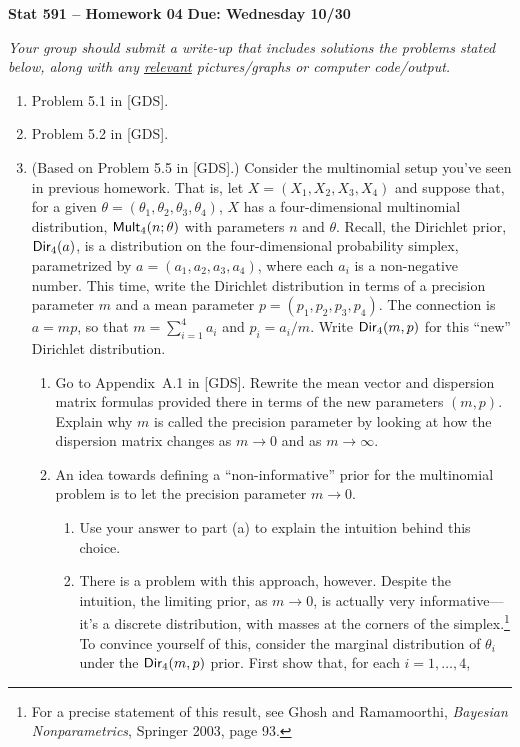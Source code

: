 \documentclass[a4paper,12pt]{article}
\begin{document}
\noindent \large \textbf{Stat 591 -- Homework 04} \hfill \textbf{Due: Wednesday 10/30} \normalsize

\medskip

\noindent \emph{Your group should submit a write-up that includes solutions the problems stated below, along with any \underline{relevant} pictures/graphs or computer code/output.}  

\medskip

\begin{enumerate}

\item Problem 5.1 in [GDS].

\item Problem 5.2 in [GDS].

\item (Based on Problem 5.5 in [GDS].)  Consider the multinomial setup you've seen in previous homework.  That is, let $X=(X_1,X_2,X_3,X_4)$ and suppose that, for a given $\theta=(\theta_1,\theta_2,\theta_3,\theta_4)$, $X$ has a four-dimensional multinomial distribution, ${\sf Mult}_4(n;\theta)$ with parameters $n$ and $\theta$.  Recall, the Dirichlet prior, ${\sf Dir}_4(a)$, is a distribution on the four-dimensional probability simplex, parametrized by $a=(a_1,a_2,a_3,a_4)$, where each $a_i$ is a non-negative number.  This time, write the Dirichlet distribution in terms of a precision parameter $m$ and a mean parameter $p=(p_1,p_2,p_3,p_4)$.  The connection is $a=mp$, so that $m=\sum_{i=1}^4 a_i$ and $p_i = a_i / m$.  Write ${\sf Dir}_4(m, p)$ for this ``new'' Dirichlet distribution.    
\begin{enumerate}
\item Go to Appendix~A.1 in [GDS].  Rewrite the mean vector and dispersion matrix formulas provided there in terms of the new parameters $(m,p)$.  Explain why $m$ is called the precision parameter by looking at how the dispersion matrix changes as $m \to 0$ and as $m \to \infty$.  
\item An idea towards defining a ``non-informative'' prior for the multinomial problem is to let the precision parameter $m \to 0$.  
\begin{enumerate}
\item Use your answer to part (a) to explain the intuition behind this choice.    
\item There is a problem with this approach, however.  Despite the intuition, the limiting prior, as $m \to 0$, is actually very informative---it's a discrete distribution, with masses at the corners of the simplex.\footnote{For a precise statement of this result, see Ghosh and Ramamoorthi, \emph{Bayesian Nonparametrics}, Springer 2003, page 93.}  To convince yourself of this, consider the marginal distribution of $\theta_i$ under the ${\sf Dir}_4(m,p)$ prior.  First show that, for each $i=1,\ldots,4$,  

\end{enumerate}
\end{enumerate}
\end{enumerate}
\end{document}
